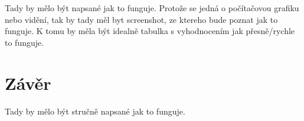\documentclass[12pt]{article}
\begin{document}
Tady by mělo být napsané jak to funguje. Protože se jedná o počítačovou grafiku nebo 
vidění, tak by tady měl byt screenshot, ze ktereho bude poznat jak to funguje.
K tomu by měla být idealně tabulka s vyhodnocením jak přesně/rychle to funguje. 


\section{Závěr}

Tady by mělo být stručně napsané jak to funguje.



\begin{flushleft}
  
\end{flushleft}

\end{document}
